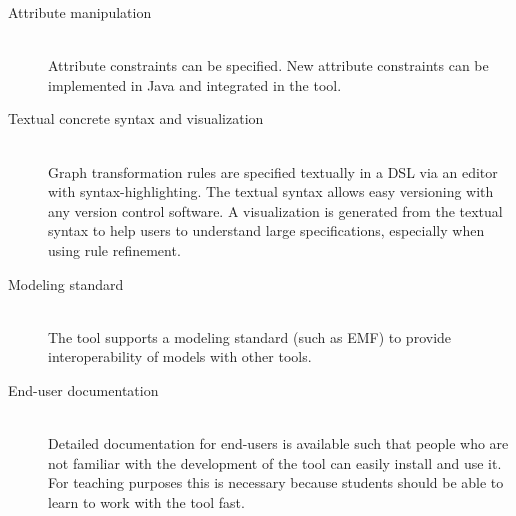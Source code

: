 \begin{description}
	\item[Attribute manipulation] ~\\
		Attribute constraints can be specified. New attribute constraints can be implemented in Java and integrated in the tool.

	\item[Textual concrete syntax and visualization] ~\\
		Graph transformation rules are specified textually in a DSL via an editor with syntax-highlighting.
		The textual syntax allows easy versioning with any version control software.
		A visualization is generated from the textual syntax to help users to understand large specifications, especially when using rule refinement.

	\item[Modeling standard] ~\\
		The tool supports a modeling standard (such as EMF) to provide interoperability of models with other tools.

	\item[End-user documentation] ~\\
		Detailed documentation for end-users is available such that people who are not familiar with the development of the tool can easily install and use it.
		For teaching purposes this is necessary because students should be able to learn to work with the tool fast.
\end{description}
